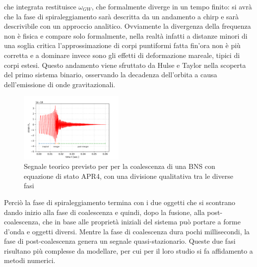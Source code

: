 che integrata restituisce $\omega_{GW}$, che formalmente diverge in un tempo finito: si avrà che la fase di spiraleggiamento sarà descritta da un andamento a chirp e sarà descrivibile con un approccio analitico. Ovviamente la divergenza della frequenza non è fisica e compare solo formalmente, nella realtà infatti a distanze minori di una soglia critica l'approssimazione di corpi puntiformi fatta fin'ora non è più corretta e a dominare invece sono gli effetti di deformazione mareale, tipici di corpi estesi. Questo andamento viene sfruttato da Hulse e Taylor nella scoperta del primo sistema binario, osservando la decadenza dell'orbita a causa dell'emissione di onde gravitazionali.
\begin{figure}
	\vspace{-24pt}
	\begin{center}
		\includegraphics[width=0.45\textwidth]{figures/Capitolo_1/APR4.pdf}
	\end{center}
	\vspace{-11pt}
	\caption{Segnale teorico previsto per per la coalescenza di una BNS con equazione di stato APR4, con una divisione qualitativa tra le diverse fasi}
	\label{fig:forma_onda_APR4}
	\vspace{-20pt}
\end{figure}
Perciò la fase di spiraleggiamento termina con i due oggetti che si scontrano dando inizio alla fase di coalescenza e quindi, dopo la fusione, alla post-coalescenza, che in base alle proprietà iniziali del sistema può portare a forme d'onda e oggetti diversi.	Mentre la fase di coalescenza dura pochi millisecondi, la fase di post-coalescenza genera un segnale quasi-stazionario. Queste due fasi risultano più complesse da modellare, per cui per il loro studio si fa affidamento a metodi numerici. \cite{maggiore2008gravitational}

